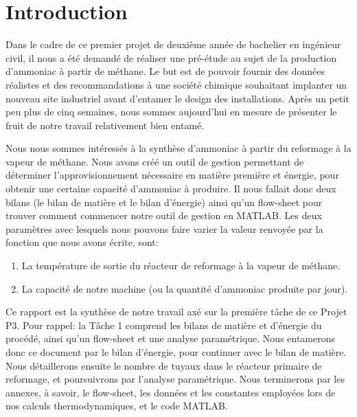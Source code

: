 \section{Introduction}

Dans le cadre de ce premier projet de deuxième année de bachelier en ingénieur civil, il nous a été demandé
de réaliser une pré-étude au sujet de la production d'ammoniac à partir de méthane. Le but est de pouvoir fournir
des données réalistes et des recommandations à une société chimique souhaitant implanter un nouveau site industriel
avant d’entamer le design des installations. Après un petit peu plus de cinq semaines, nous sommes aujourd'hui en
mesure de présenter le fruit de notre travail relativement bien entamé. 

Nous nous sommes intéressés à la synthèse d’ammoniac à partir du reformage à la vapeur de méthane. Nous avons
créé un outil de gestion permettant de déterminer l’approvisionnement nécessaire en matière première et énergie, pour
obtenir une certaine capacité d'ammoniac à produire. Il nous fallait donc deux bilans (le bilan de matière et le
bilan d'énergie) ainsi qu'un flow-sheet pour trouver comment commencer notre outil de gestion en \textsc{MATLAB}. Les
deux paramètres avec lesquels nous pouvons faire varier la valeur renvoyée par la fonction que nous avons écrite, sont:

\begin{enumerate}
\item La température de sortie du réacteur de reformage à la vapeur de méthane.
\item La capacité de notre machine (ou la quantité d'ammoniac  produite par jour).
\end{enumerate}


Ce rapport est la synthèse de notre travail axé sur la première tâche de ce Projet P3. Pour rappel: la Tâche 1 comprend
les bilans de matière et d’énergie du procédé, ainsi qu'un flow-sheet et une analyse paramétrique. Nous entamerons donc ce
document par le bilan d'énergie, pour continuer avec le bilan de matière. Nous détaillerons ensuite le nombre de tuyaux
dans le réacteur primaire de reformage, et poursuivrons par l'analyse paramétrique. Nous terminerons par les annexes, à
savoir, le flow-sheet, les données et les constantes employées lors de nos calculs thermodynamiques, et le code \textsc{MATLAB}.		

